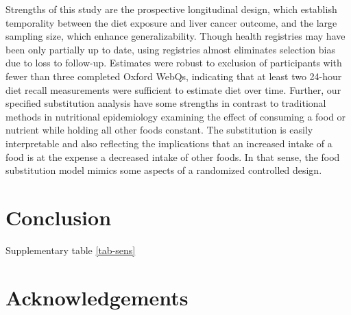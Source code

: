 \documentclass[sn-basic,Numbered,iicol,pdflatex]{sn-jnl}
\begin{document}
Strengths of this study are the prospective longitudinal design, which
establish temporality between the diet exposure and liver cancer
outcome, and the large sampling size, which enhance generalizability.
Though health registries may have been only partially up to date, using
registries almost eliminates selection bias due to loss to follow-up.
Estimates were robust to exclusion of participants with fewer than three
completed Oxford WebQs, indicating that at least two 24-hour diet recall
measurements were sufficient to estimate diet over time. Further, our
specified substitution analysis have some strengths in contrast to
traditional methods in nutritional epidemiology examining the effect of
consuming a food or nutrient while holding all other foods constant. The
substitution is easily interpretable and also reflecting the
implications that an increased intake of a food is at the expense a
decreased intake of other foods. In that sense, the food substitution
model mimics some aspects of a randomized controlled design.

\hypertarget{sec5}{%
\section{Conclusion}\label{sec5}}

Supplementary table \ref{tab-sens}

\hypertarget{sec6}{%
\section{Acknowledgements}\label{sec6}}

\newpage
\end{document}
